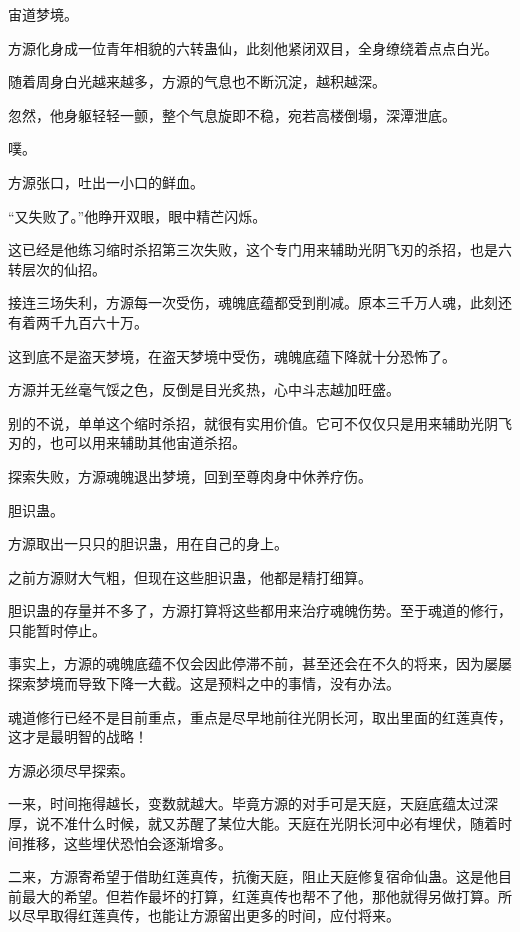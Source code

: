 
\begin{this_body}

宙道梦境。

方源化身成一位青年相貌的六转蛊仙，此刻他紧闭双目，全身缭绕着点点白光。

随着周身白光越来越多，方源的气息也不断沉淀，越积越深。

忽然，他身躯轻轻一颤，整个气息旋即不稳，宛若高楼倒塌，深潭泄底。

噗。

方源张口，吐出一小口的鲜血。

“又失败了。”他睁开双眼，眼中精芒闪烁。

这已经是他练习缩时杀招第三次失败，这个专门用来辅助光阴飞刃的杀招，也是六转层次的仙招。

接连三场失利，方源每一次受伤，魂魄底蕴都受到削减。原本三千万人魂，此刻还有着两千九百六十万。

这到底不是盗天梦境，在盗天梦境中受伤，魂魄底蕴下降就十分恐怖了。

方源并无丝毫气馁之色，反倒是目光炙热，心中斗志越加旺盛。

别的不说，单单这个缩时杀招，就很有实用价值。它可不仅仅只是用来辅助光阴飞刃的，也可以用来辅助其他宙道杀招。

探索失败，方源魂魄退出梦境，回到至尊肉身中休养疗伤。

胆识蛊。

方源取出一只只的胆识蛊，用在自己的身上。

之前方源财大气粗，但现在这些胆识蛊，他都是精打细算。

胆识蛊的存量并不多了，方源打算将这些都用来治疗魂魄伤势。至于魂道的修行，只能暂时停止。

事实上，方源的魂魄底蕴不仅会因此停滞不前，甚至还会在不久的将来，因为屡屡探索梦境而导致下降一大截。这是预料之中的事情，没有办法。

魂道修行已经不是目前重点，重点是尽早地前往光阴长河，取出里面的红莲真传，这才是最明智的战略！

方源必须尽早探索。

一来，时间拖得越长，变数就越大。毕竟方源的对手可是天庭，天庭底蕴太过深厚，说不准什么时候，就又苏醒了某位大能。天庭在光阴长河中必有埋伏，随着时间推移，这些埋伏恐怕会逐渐增多。

二来，方源寄希望于借助红莲真传，抗衡天庭，阻止天庭修复宿命仙蛊。这是他目前最大的希望。但若作最坏的打算，红莲真传也帮不了他，那他就得另做打算。所以尽早取得红莲真传，也能让方源留出更多的时间，应付将来。


\end{this_body}
